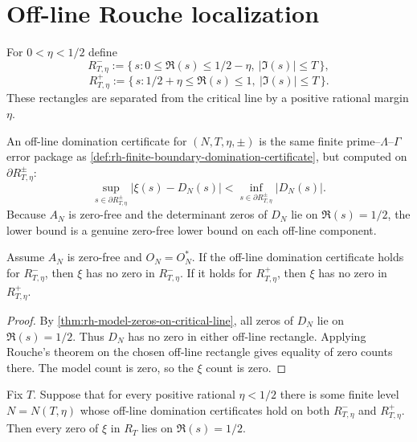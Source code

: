 \section{Off-line Rouche localization}
\label{sec:rh-offline-rouche-localization}

\begin{definition}
\label{def:rh-offline-rectangles}
For $0<\eta<1/2$ define
$$
R^-_{T,\eta}:=\{\,s:0\le\Re(s)\le1/2-\eta,\ |\Im(s)|\le T\,\},
$$
$$
R^+_{T,\eta}:=\{\,s:1/2+\eta\le\Re(s)\le1,\ |\Im(s)|\le T\,\}.
$$
These rectangles are separated from the critical line by a positive rational
margin $\eta$.
\end{definition}

\begin{definition}
\label{def:rh-offline-domination-certificate}
An off-line domination certificate for $(N,T,\eta,\pm)$ is the same finite
prime--$\Lambda$--$\Gamma$ error package as
\autoref{def:rh-finite-boundary-domination-certificate}, but computed on
$\partial R^{\pm}_{T,\eta}$:
$$
\sup_{s\in\partial R^{\pm}_{T,\eta}}|\xi(s)-D_N(s)|
<
\inf_{s\in\partial R^{\pm}_{T,\eta}}|D_N(s)|.
$$
Because $A_N$ is zero-free and the determinant zeros of $D_N$ lie on
$\Re(s)=1/2$, the lower bound is a genuine zero-free lower bound on each
off-line component.
\end{definition}

\begin{theorem}
\label{thm:rh-offline-rouche-exclusion}
Assume $A_N$ is zero-free and $O_N=O_N^*$.  If the off-line domination
certificate holds for $R^-_{T,\eta}$, then $\xi$ has no zero in
$R^-_{T,\eta}$.  If it holds for $R^+_{T,\eta}$, then $\xi$ has no zero in
$R^+_{T,\eta}$.
\end{theorem}

\begin{proof}
By \autoref{thm:rh-model-zeros-on-critical-line}, all zeros of $D_N$ lie on
$\Re(s)=1/2$.  Thus $D_N$ has no zero in either off-line rectangle.  Applying
Rouche's theorem on the chosen off-line rectangle gives equality of zero
counts there.  The model count is zero, so the $\xi$ count is zero.
\end{proof}

\begin{corollary}
\label{cor:rh-finite-height-critical-line-from-offline-rouche}
Fix $T$.  Suppose that for every positive rational $\eta<1/2$ there is some
finite level $N=N(T,\eta)$ whose off-line domination certificates hold on both
$R^-_{T,\eta}$ and $R^+_{T,\eta}$.  Then every zero of $\xi$ in $R_T$ lies on
$\Re(s)=1/2$.
\end{corollary}

